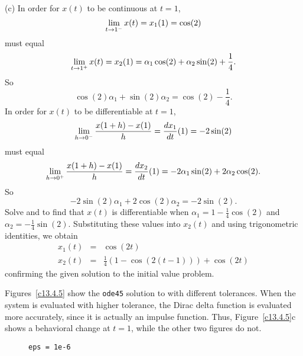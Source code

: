 \documentclass{ximera}
\begin{document}
(c) In order for $x(t)$ to be continuous at $t = 1$,
\[
\displaystyle\lim_{t \rightarrow 1^{-}} x(t) = x_1(1) = \cos(2)
\]
must equal
\[
\displaystyle\lim_{t \rightarrow 1^{+}} x(t) = x_2(1) =
\alpha_1\cos(2) + \alpha_2\sin(2) + \frac{1}{4}.
\]
So
\begin{equation} \label{ex:13.4.2a}
\cos(2)\alpha_1 + \sin(2)\alpha_2 = \cos(2) - \frac{1}{4}.
\end{equation}
In order for $x(t)$ to be differentiable at $t = 1$,
\[
\displaystyle\lim_{h \rightarrow 0^{-}} \frac{x(1 + h) - x(1)}{h} =
\frac{dx_1}{dt}(1) = -2\sin(2)
\]
must equal
\[
\displaystyle\lim_{h \rightarrow 0^{+}} \frac{x(1 + h) - x(1)}{h} =
\frac{dx_2}{dt}(1) = -2\alpha_1\sin(2) + 2\alpha_2\cos(2).
\]
So
\begin{equation} \label{ex:13.4.2b}
-2\sin(2)\alpha_1 + 2\cos(2)\alpha_2 = -2\sin(2).
\end{equation}
Solve  and  to find that $x(t)$ is
differentiable when $\alpha_1 = 1 - \frac{1}{4}\cos(2)$ and $\alpha_2
= -\frac{1}{4}\sin(2)$.  Substituting these values into $x_2(t)$ and
using trigonometric identities, we obtain
\[
\begin{array}{rcl}
x_1(t) & = & \cos(2t) \\
x_2(t) & = & \frac{1}{4}(1 - \cos(2(t - 1))) + \cos(2t)
\end{array}
\]
confirming the given solution to the initial value problem.











 \ans Figures~\ref{c13.4.5} show the {\tt ode45} solution
to  with different tolerances.  When the system is
evaluated with higher tolerance, the Dirac delta function is evaluated
more accurately, since it is actually an impulse function.  Thus,
Figure~\ref{c13.4.5}c shows a behavioral change at $t = 1$, while the
other two figures do not.

\begin{figure}[htb]
                       \centerline{%
                       }
                \centerline{{\tt eps = 1e-6}\hspace{1.2in}{\tt eps = 1e-8}
\hspace{1.2in}{\tt eps = 1e-10}}
\end{figure}
\end{document}
